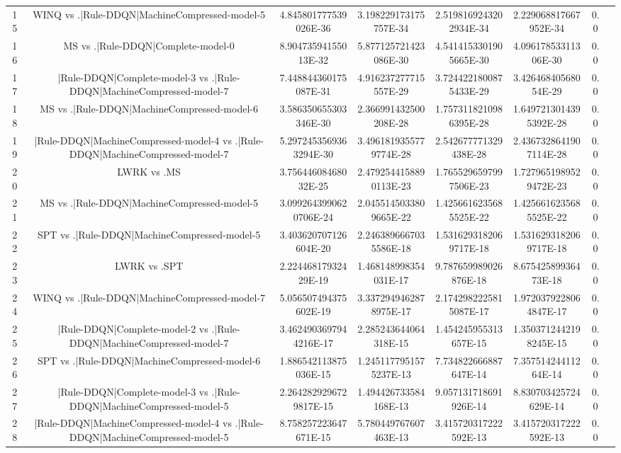 \documentclass[a3paper,10pt]{article}
\begin{document}
\begin{table}[!htp]
\begin{tabular}{cccccccc}
15&WINQ vs .|Rule-DDQN|MachineCompressed-model-5&4.845801777539026E-36&3.198229173175757E-34&2.5198169243202934E-34&2.229068817667952E-34&0.0\\
16&MS vs .|Rule-DDQN|Complete-model-0&8.90473594155013E-32&5.877125721423086E-30&4.5414153301905665E-30&4.09617853311306E-30&0.0\\
17&|Rule-DDQN|Complete-model-3 vs .|Rule-DDQN|MachineCompressed-model-7&7.448844360175087E-31&4.916237277715557E-29&3.7244221800875433E-29&3.42646840568054E-29&0.0\\
18&MS vs .|Rule-DDQN|MachineCompressed-model-6&3.586350655303346E-30&2.366991432500208E-28&1.7573118210986395E-28&1.6497213014395392E-28&0.0\\
19&|Rule-DDQN|MachineCompressed-model-4 vs .|Rule-DDQN|MachineCompressed-model-7&5.2972453569363294E-30&3.4961819355779774E-28&2.542677771329438E-28&2.4367328641907114E-28&0.0\\
20&LWRK vs .MS&3.75644608468032E-25&2.4792544158890113E-23&1.7655296597997506E-23&1.7279651989529472E-23&0.0\\
21&MS vs .|Rule-DDQN|MachineCompressed-model-5&3.0992643990620706E-24&2.0455145033809665E-22&1.4256616235685525E-22&1.4256616235685525E-22&0.0\\
22&SPT vs .|Rule-DDQN|MachineCompressed-model-5&3.403620707126604E-20&2.2463896667035586E-18&1.5316293182069717E-18&1.5316293182069717E-18&0.0\\
23&LWRK vs .SPT&2.22446817932429E-19&1.468148998354031E-17&9.787659989026876E-18&8.67542589936473E-18&0.0\\
24&WINQ vs .|Rule-DDQN|MachineCompressed-model-7&5.056507494375602E-19&3.3372949462878975E-17&2.1742982225815087E-17&1.9720379228064847E-17&0.0\\
25&|Rule-DDQN|Complete-model-2 vs .|Rule-DDQN|MachineCompressed-model-7&3.4624903697944216E-17&2.285243644064318E-15&1.454245955313657E-15&1.3503712442198245E-15&0.0\\
26&SPT vs .|Rule-DDQN|MachineCompressed-model-6&1.886542113875036E-15&1.2451177951575237E-13&7.734822666887647E-14&7.35751424411264E-14&0.0\\
27&|Rule-DDQN|Complete-model-3 vs .|Rule-DDQN|MachineCompressed-model-5&2.2642829296729817E-15&1.494426733584168E-13&9.057131718691926E-14&8.830703425724629E-14&0.0\\
28&|Rule-DDQN|MachineCompressed-model-4 vs .|Rule-DDQN|MachineCompressed-model-5&8.758257223647671E-15&5.780449767607463E-13&3.415720317222592E-13&3.415720317222592E-13&0.0\\

\end{tabular}
\end{table}
\end{document}
